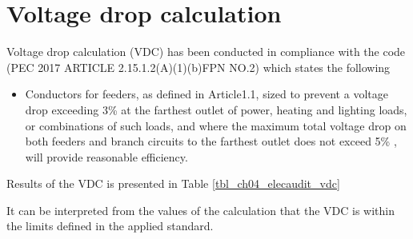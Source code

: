 \section{Voltage drop calculation} \label{ch04_elecaudit_voltagedropcalculation}
Voltage drop calculation (VDC) has been conducted in compliance with the code (PEC 2017 ARTICLE 2.15.1.2(A)(1)(b)FPN NO.2) which states the following


\begin{itemize}
	\item Conductors  for feeders, as defined in Article1.1, sized to prevent a voltage drop exceeding 3\% at the farthest outlet of power, heating and lighting loads, or combinations of such
	loads, and where the maximum total voltage drop on both feeders and branch circuits to the  
	farthest outlet does not exceed 5\% , will provide reasonable efficiency.
	
\end{itemize}

Results of the VDC is presented in Table \ref{tbl_ch04_elecaudit_vdc}



It can be interpreted from the values of the calculation that the VDC is within the limits defined in the applied standard.